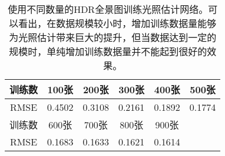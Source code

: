 \begin{table}[htbp]
    \centering
    \begin{tabular}{c|c|c|c|c|c}
        \toprule
        训练数  &  100张&  200张&  300张&  400张&  500张 \\ \hline
        RMSE &  0.4502& 0.3108& 0.2161& 0.1892&0.1774 \\
        \midrule
        训练数  &  600张&  700张&  800张&  900张&  ~ \\ \hline
        RMSE &  0.1683&0.1633&0.1621&0.1614 & ~ \\
        \bottomrule
    \end{tabular}
    \caption{
        \label{table:eval-data-size}
        使用不同数量的HDR全景图训练光照估计网络。可以看出，在数据规模较小时，增加训练数据量能够为光照估计带来巨大的提升，但当数据达到一定的规模时，单纯增加训练数据量并不能起到很好的效果。
    }
\end{table}